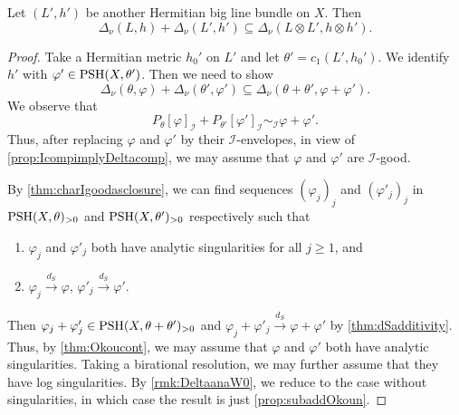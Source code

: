 \begin{proposition}\label{prop:suba}
	Let $(L', h')$ be another Hermitian big line bundle on $X$. Then
	\[
		\Delta_{\nu}(L,h)+\Delta_{\nu}(L', h')\subseteq\Delta_{\nu}(L\otimes L',h\otimes h').
	\]
\end{proposition}
\begin{proof}
	Take a Hermitian metric $h_0'$ on $L'$ and let $\theta'=c_1(L',h_0')$. We identify $h'$ with $\varphi'\in \mathrm{PSH}(X,\theta')$. Then we need to show
	\begin{equation}\label{eq:suba}
		\Delta_{\nu}(\theta,\varphi)+\Delta_{\nu}(\theta',\varphi')\subseteq \Delta_{\nu}(\theta+\theta',\varphi+\varphi').
	\end{equation}
    We observe that
    \[
    P_{\theta}[\varphi]_{\mathcal{I}}+P_{\theta'}[\varphi']_{\mathcal{I}}\sim_{\mathcal{I}} \varphi+\varphi'.
    \]
    Thus, after replacing $\varphi$ and $\varphi'$ by their $\mathcal{I}$-envelopes, in view of \cref{prop:IcompimplyDeltacomp}, we may assume that $\varphi$ and $\varphi'$ are $\mathcal{I}$-good.


	By \cref{thm:charIgoodasclosure}, we can find sequences $(\varphi_j)_j$ and $(\varphi'_j)_j$ in $\mathrm{PSH}(X,\theta)_{>0}$ and $\mathrm{PSH}(X,\theta')_{>0}$ respectively such that
	\begin{enumerate}
		\item\label{itm:chapter-Okounkov:L930:1} $\varphi_j$ and $\varphi'_j$ both have analytic singularities for all $j\geq 1$, and
		\item\label{itm:chapter-Okounkov:L930:2} $\varphi_j\xrightarrow{d_S}\varphi$, $\varphi'_j\xrightarrow{d_S}\varphi'$.
	\end{enumerate}
	Then $\varphi_j+\varphi'_j\in \mathrm{PSH}(X,\theta+\theta')_{>0}$ and $\varphi_j+\varphi'_j\xrightarrow{d_S} \varphi+\varphi'$ by \cref{thm:dSadditivity}. Thus, by \cref{thm:Okoucont}, we may assume that $\varphi$ and $\varphi'$ both have analytic singularities. Taking a birational resolution, we may further assume that they have log singularities. By \cref{rmk:DeltaanaW0}, we reduce to the case without singularities, in which case the result is just \cref{prop:subaddOkoun}.
\end{proof}

